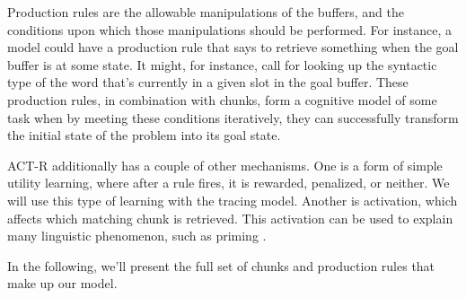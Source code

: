 Production rules are the allowable manipulations of the buffers, and the conditions upon which those manipulations should be performed. For instance, a model could have a production rule that says to retrieve something when the goal buffer is at some state. It might, for instance, call for looking up the syntactic type of the word that's currently in a given slot in the goal buffer. These production rules, in combination with chunks, form a cognitive model of some task when by meeting these conditions iteratively, they can successfully transform the initial state of the problem into its goal state. 

ACT-R additionally has a couple of other mechanisms. One is a form of simple utility learning, where after a rule fires, it is rewarded, penalized, or neither. We will use this type of learning with the tracing model. Another is activation, which affects which matching chunk is retrieved. This activation can be used to explain many linguistic phenomenon, such as priming \citep{priming} \citep{model}.  

In the following, we'll present the full set of chunks and production rules that make up our model. 